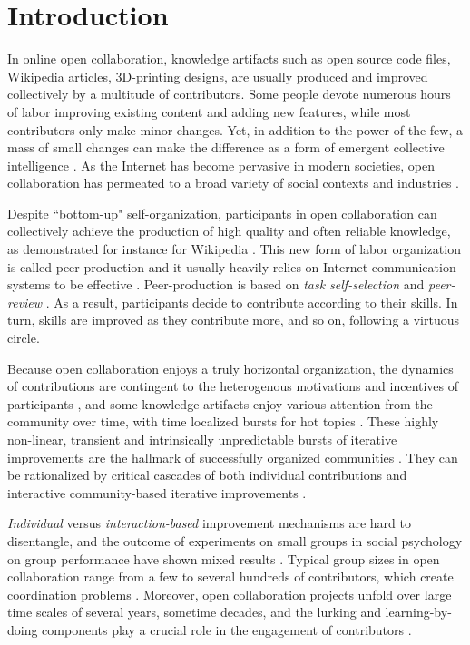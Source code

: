 \section{Introduction}
In online open collaboration, knowledge artifacts such as open source code files, Wikipedia articles,  3D-printing designs, are usually produced and improved collectively by a multitude of contributors. Some people devote numerous hours of labor improving existing content and adding new features, while most contributors only make minor changes. Yet, in addition to the power of the few, a mass of small changes can make the difference as a form of emergent collective intelligence \cite{kittur2007power}.  As the Internet has become pervasive in modern societies, open collaboration has permeated to a broad variety of social contexts and industries \cite{benkler2011leviathan}. 

Despite ``bottom-up" self-organization, participants in open collaboration can collectively achieve  the production of high quality and often reliable knowledge, as demonstrated for instance for Wikipedia \cite{giles2005internet}. This new form of labor organization is called peer-production and it usually heavily relies on Internet communication systems to be effective \cite{benkler2002}. Peer-production is based on {\it task self-selection} and {\it peer-review} \cite{benkler2002}. As a result, participants decide to contribute according to their skills. In turn, skills are improved as they contribute more, and so on, following a virtuous circle.

Because open collaboration enjoys a truly horizontal organization, the dynamics of contributions are contingent to the heterogenous motivations and incentives of participants \cite{vonKrogh2012}, and some knowledge artifacts enjoy various attention from the community over time, with time localized bursts for hot topics \cite{keegan2013hotoff}. These  highly non-linear, transient and intrinsically unpredictable bursts of iterative improvements are the hallmark of successfully organized communities \cite{vonkrogh2014designing}. They can be rationalized by critical cascades of both individual contributions and interactive community-based iterative improvements \cite{sornette2014howmuch}. 

{\it Individual} versus {\it interaction-based} improvement mechanisms are hard to disentangle, and the outcome of experiments on small groups in social psychology on group performance have shown mixed results \cite{shaw1932comparison}. Typical group sizes in open collaboration range from a few to several hundreds of contributors, which create coordination problems \cite{halfaker2013}. Moreover, open collaboration projects unfold over large time scales of several years, sometime decades, and the lurking and learning-by-doing components play a crucial role in the engagement of contributors \cite{vonkrogh2003}.

